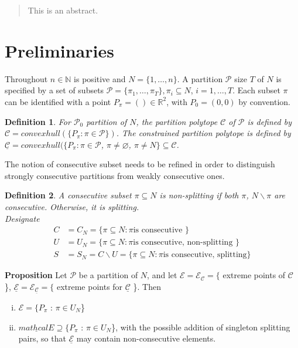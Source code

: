 \documentclass{article}
\newtheorem{definition}{Definition}
\theoremstyle{case}
\begin{document}
\sloppy

\begin{abstract}
This is an abstract.
\end{abstract}

\section{Preliminaries}

Throughout $n \in \mathbb{N}$ is positive and $N = \{1, \dots, n\}$. A partition $\mathcal{P}$ size $T$ of $N$ is specified by a set of subsets $\mathcal{P} = \{ \pi_1, \dots, \pi_T \}, \pi_i \subseteq N$, $i = 1, \dots, T$. Each subset $\pi$ can be identified with a point $P_\pi = () \in \mathbb{R}^2$, with $P_0 = (0,0)$ by convention.

\begin{definition}
For $\mathcal{P}_0$ partition of $N$, the partition polytope $\mathcal{C}$ of $\mathcal{P}$ is defined by $\mathcal{C} = convexhull(\{P_\pi : \pi \in \mathcal{P}\})$. 
The constrained partition polytope is defined by $\underline{\mathcal{C}} = convexhull(\{P_\pi : \pi \in \mathcal{P}$, $\pi \neq \varnothing$, $\pi \neq N\} \subseteq \mathcal{C}$. 
\end{definition}

The notion of consecutive subset needs to be refined in order to distinguish strongly consecutive partitions from weakly consecutive ones. 

\begin{definition}
A consecutive subset $\pi \subseteq N$ is non-splitting if both $\pi$, $N  \backslash \pi$ are consecutive. Otherwise, it is splitting.\\
Designate
\begin{align*}
C &= C_N = \{ \pi \subseteq N : \pi \textrm{is consecutive \} }\\
U &= U_N = \{ \pi \subseteq N : \pi \textrm{is consecutive, non-splitting \}} \\
S &= S_N = C \backslash U = \{ \pi \subseteq N : \pi \textrm{is consecutive, splitting} \}
\end{align*}
\end{definition}

\newtheorem{prop}{Proposition}
\textbf{Proposition} Let $\mathcal{P}$ be a partition of $N$, and let $\mathcal{E} = \mathcal{E}_\mathcal{C} = \{$ extreme points of $\mathcal{C}$ \}, $\underline{\mathcal{E}} = \mathcal{E}_{\underline{\mathcal{C}}} = \{$ extreme points for $\underline{\mathcal{C}}$ \}. Then
\begin{enumerate}[(i)]
	\item $\mathcal{E} = \{P_\pi$ : $\pi \in U_N$\}
	\item $\underline{mathcal{E}} \supseteq \{P_\pi$ : $\pi \in U_N$\}, with the possible addition of singleton splitting pairs, so that $\underline{\mathcal{E}}$ may contain non-consecutive elements.
\end{enumerate}
\end{document}
